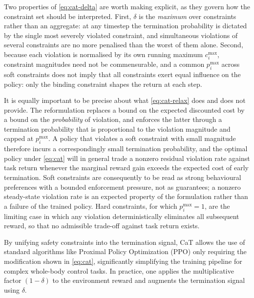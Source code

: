 Two properties of \cref{eq:cat-delta} are worth making explicit, as they govern how the constraint set should be interpreted. First, $\delta$ is the \emph{maximum} over constraints rather than an aggregate: at any timestep the termination probability is dictated by the single most severely violated constraint, and simultaneous violations of several constraints are no more penalised than the worst of them alone. Second, because each violation is normalised by its own running maximum $c_i^{\max}$, constraint magnitudes need not be commensurable, and a common $p_i^{\max}$ across soft constraints does not imply that all constraints exert equal influence on the policy: only the binding constraint shapes the return at each step.

It is equally important to be precise about what \cref{eq:cat-relax} does and does not provide. The reformulation replaces a bound on the expected discounted cost by a bound on the \emph{probability} of violation, and enforces the latter through a termination probability that is proportional to the violation magnitude and capped at $p_i^{\max}$. A policy that violates a soft constraint with small magnitude therefore incurs a correspondingly small termination probability, and the optimal policy under \cref{eq:cat} will in general trade a nonzero residual violation rate against task return whenever the marginal reward gain exceeds the expected cost of early termination. Soft constraints are consequently to be read as strong behavioural preferences with a bounded enforcement pressure, not as guarantees; a nonzero steady-state violation rate is an expected property of the formulation rather than a failure of the trained policy. Hard constraints, for which $p_i^{\max}=1$, are the limiting case in which any
violation deterministically eliminates all subsequent reward, so that no admissible
trade-off against task return exists.

By unifying safety constraints into the termination signal, CaT allows the use of standard algorithms like Proximal Policy Optimization (PPO) \citep{schulman2017proximalpolicyoptimizationalgorithms} only requiring the modification shown in \cref{eq:cat}, significantly simplifying the training pipeline for complex whole-body control tasks. In practice, one applies the multiplicative factor $(1-\delta)$ to the environment reward and augments the termination signal using $\delta$.

